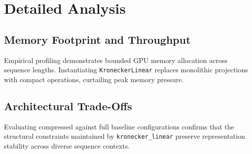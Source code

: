 \section{Detailed Analysis}

\subsection{Memory Footprint and Throughput}
Empirical profiling demonstrates bounded GPU memory allocation across sequence lengths. Instantiating \texttt{KroneckerLinear} replaces monolithic projections with compact operations, curtailing peak memory pressure.

\subsection{Architectural Trade-Offs}
Evaluating compressed against full baseline configurations confirms that the structural constraints maintained by \texttt{kronecker_linear} preserve representation stability across diverse sequence contexts.
